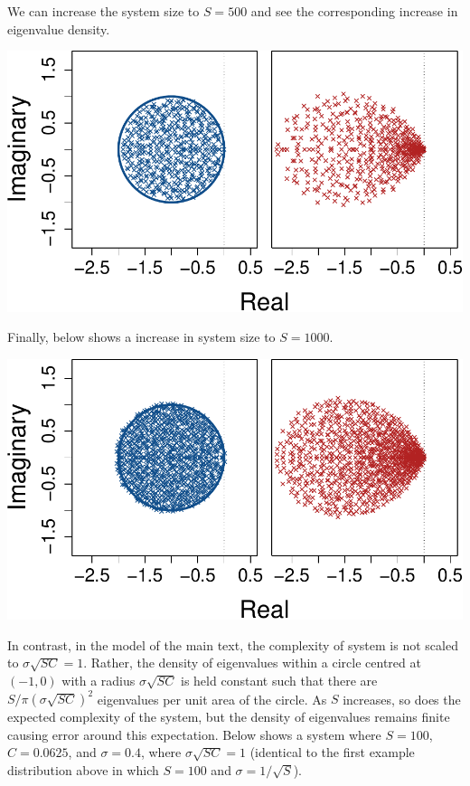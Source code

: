 \documentclass[]{article}
\begin{document}
We can increase the system size to \(S = 500\) and see the corresponding
increase in eigenvalue density.

\includegraphics{SI_files/figure-latex/unnamed-chunk-38-1.pdf}

Finally, below shows a increase in system size to \(S = 1000\).

\includegraphics{SI_files/figure-latex/unnamed-chunk-39-1.pdf}

In contrast, in the model of the main text, the complexity of system is
not scaled to \(\sigma\sqrt{SC} = 1\). Rather, the density of
eigenvalues within a circle centred at \((-1, 0)\) with a radius
\(\sigma\sqrt{SC}\) is held constant such that there are
\(S / \pi(\sigma\sqrt{SC})^2\) eigenvalues per unit area of the circle.
As \(S\) increases, so does the expected complexity of the system, but
the density of eigenvalues remains finite causing error around this
expectation. Below shows a system where \(S = 100\), \(C = 0.0625\), and
\(\sigma = 0.4\), where \(\sigma \sqrt{SC} = 1\) (identical to the first
example distribution above in which \(S = 100\) and
\(\sigma = 1/\sqrt{S}\)).
\end{document}
